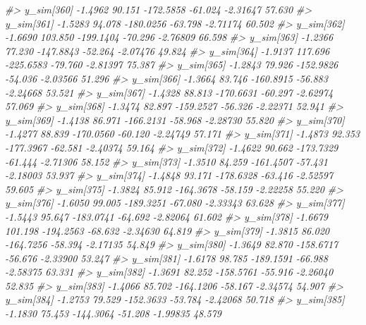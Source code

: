 \documentclass[
  10pt,
  italian,
  a4paper,
  extrafontsizes,onecolumn,openright
  ]{memoir}
\newenvironment{Shaded}{\begin{snugshade}}{\end{snugshade}}
\newcommand{\CommentTok}[1]{\textcolor[rgb]{0.56,0.35,0.01}{\textit{#1}}}
\begin{document}
\begin{Shaded}
\begin{Highlighting}[]
\CommentTok{\#\textgreater{}   y\_sim[360] {-}1.4962  90.151 {-}172.5858 {-}61.024 {-}2.31647 57.630}
\CommentTok{\#\textgreater{}   y\_sim[361] {-}1.5283  94.078 {-}180.0256 {-}63.798 {-}2.71174 60.502}
\CommentTok{\#\textgreater{}   y\_sim[362] {-}1.6690 103.850 {-}199.1404 {-}70.296 {-}2.76809 66.598}
\CommentTok{\#\textgreater{}   y\_sim[363] {-}1.2366  77.230 {-}147.8843 {-}52.264 {-}2.07476 49.824}
\CommentTok{\#\textgreater{}   y\_sim[364] {-}1.9137 117.696 {-}225.6583 {-}79.760 {-}2.81397 75.387}
\CommentTok{\#\textgreater{}   y\_sim[365] {-}1.2843  79.926 {-}152.9826 {-}54.036 {-}2.03566 51.296}
\CommentTok{\#\textgreater{}   y\_sim[366] {-}1.3664  83.746 {-}160.8915 {-}56.883 {-}2.24668 53.521}
\CommentTok{\#\textgreater{}   y\_sim[367] {-}1.4328  88.813 {-}170.6631 {-}60.297 {-}2.62974 57.069}
\CommentTok{\#\textgreater{}   y\_sim[368] {-}1.3474  82.897 {-}159.2527 {-}56.326 {-}2.22371 52.941}
\CommentTok{\#\textgreater{}   y\_sim[369] {-}1.4138  86.971 {-}166.2131 {-}58.968 {-}2.28730 55.820}
\CommentTok{\#\textgreater{}   y\_sim[370] {-}1.4277  88.839 {-}170.0560 {-}60.120 {-}2.24749 57.171}
\CommentTok{\#\textgreater{}   y\_sim[371] {-}1.4873  92.353 {-}177.3967 {-}62.581 {-}2.40374 59.164}
\CommentTok{\#\textgreater{}   y\_sim[372] {-}1.4622  90.662 {-}173.7329 {-}61.444 {-}2.71306 58.152}
\CommentTok{\#\textgreater{}   y\_sim[373] {-}1.3510  84.259 {-}161.4507 {-}57.431 {-}2.18003 53.937}
\CommentTok{\#\textgreater{}   y\_sim[374] {-}1.4848  93.171 {-}178.6328 {-}63.416 {-}2.52597 59.605}
\CommentTok{\#\textgreater{}   y\_sim[375] {-}1.3824  85.912 {-}164.3678 {-}58.159 {-}2.22258 55.220}
\CommentTok{\#\textgreater{}   y\_sim[376] {-}1.6050  99.005 {-}189.3251 {-}67.080 {-}2.33343 63.628}
\CommentTok{\#\textgreater{}   y\_sim[377] {-}1.5443  95.647 {-}183.0741 {-}64.692 {-}2.82064 61.602}
\CommentTok{\#\textgreater{}   y\_sim[378] {-}1.6679 101.198 {-}194.2563 {-}68.632 {-}2.34630 64.819}
\CommentTok{\#\textgreater{}   y\_sim[379] {-}1.3815  86.020 {-}164.7256 {-}58.394 {-}2.17135 54.849}
\CommentTok{\#\textgreater{}   y\_sim[380] {-}1.3649  82.870 {-}158.6717 {-}56.676 {-}2.33900 53.247}
\CommentTok{\#\textgreater{}   y\_sim[381] {-}1.6178  98.785 {-}189.1591 {-}66.988 {-}2.58375 63.331}
\CommentTok{\#\textgreater{}   y\_sim[382] {-}1.3691  82.252 {-}158.5761 {-}55.916 {-}2.26040 52.835}
\CommentTok{\#\textgreater{}   y\_sim[383] {-}1.4066  85.702 {-}164.1206 {-}58.167 {-}2.34574 54.907}
\CommentTok{\#\textgreater{}   y\_sim[384] {-}1.2753  79.529 {-}152.3633 {-}53.784 {-}2.42068 50.718}
\CommentTok{\#\textgreater{}   y\_sim[385] {-}1.1830  75.453 {-}144.3064 {-}51.208 {-}1.99835 48.579}

\end{Highlighting}
\end{Shaded}
\end{document}
